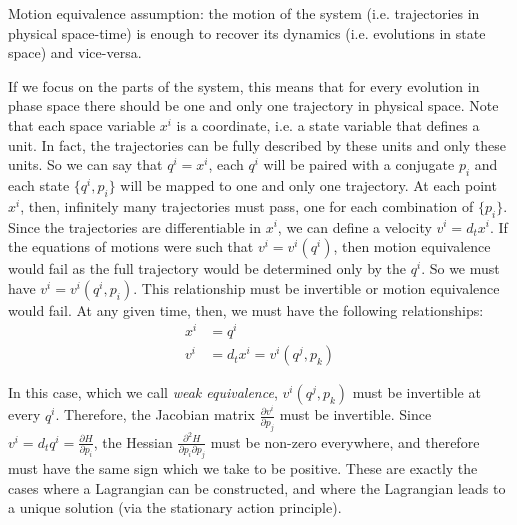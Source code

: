 \documentclass[letterpaper]{article}
\begin{document}
Motion equivalence assumption: the motion of the system (i.e. trajectories in physical space-time) is enough to recover its dynamics (i.e. evolutions in state space) and vice-versa.

If we focus on the parts of the system, this means that for every evolution in phase space there should be one and only one trajectory in physical space. Note that each space variable $x^i$ is a coordinate, i.e. a state variable that defines a unit. In fact, the trajectories can be fully described by these units and only these units. So we can say that $q^i=x^i$, each $q^i$ will be paired with a conjugate $p_i$ and each state $\{q^i, p_i\}$ will be mapped to one and only one trajectory. At each point $x^i$, then, infinitely many trajectories must pass, one for each combination of $\{p_i\}$. Since the trajectories are differentiable in $x^i$, we can define a velocity $v^i = d_t x^i$. If the equations of motions were such that $v^i=v^i(q^i)$, then motion equivalence would fail as the full trajectory would be determined only by the $q^i$. So we must have $v^i=v^i(q^i, p_i)$. This relationship must be invertible or motion equivalence would fail. At any given time, then, we must have the following relationships:
\begin{equation}
\begin{aligned}
x^i &= q^i \\
v^i &= d_t x^i = v^i(q^j, p_k)
\end{aligned}
\end{equation}

In this case, which we call \textit{weak equivalence}, $v^i(q^j, p_k)$ must be invertible at every $q^i$. Therefore, the Jacobian matrix  $\frac{\partial v^i}{\partial p_j}$ must be invertible. Since $v^i = d_t q^i = \frac{\partial H}{\partial p_i}$, the Hessian $\frac{\partial^2 H}{\partial p_i \partial p_j}$ must be non-zero everywhere, and therefore must have the same sign which we take to be positive. These are exactly the cases where a Lagrangian can be constructed, and where the Lagrangian leads to a unique solution (via the stationary action principle).
\end{document}
